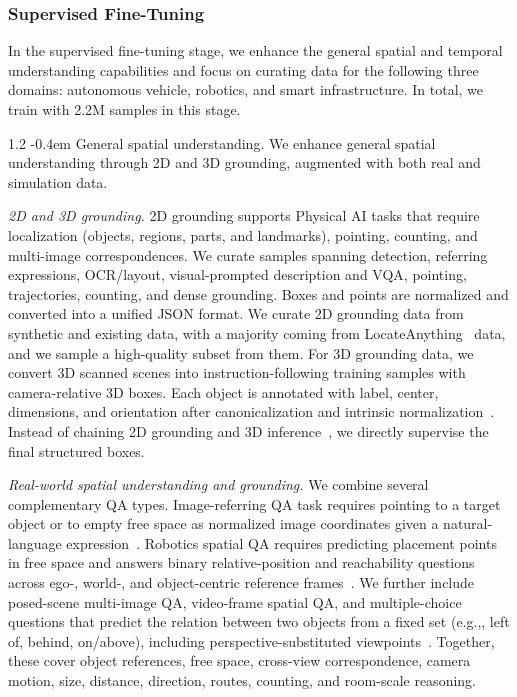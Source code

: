 \documentclass{llmxive}
\makeatletter
\providecommand{\eg}{e.g.,\xspace}
\providecommand{\paragraph}{  \@startsection{paragraph}{4}{\z@}    {1\baselineskip \@plus .2\baselineskip}    {-0.4em}    {\normalfont\normalsize\bfseries}}
\makeatother
\begin{document}
\subsubsection{Supervised Fine-Tuning}
\label{subsubsec::data_reas_posttrain}

In the supervised fine-tuning stage, we enhance the general spatial and temporal understanding capabilities and focus on curating data for the following three domains: autonomous vehicle, robotics, and smart infrastructure. In total, we train with 2.2M samples in this stage.

\paragraph{General spatial understanding.}
We enhance general spatial understanding through 2D and 3D grounding, augmented with both real and simulation data.

\textit{2D and 3D grounding.} 2D grounding supports Physical AI tasks that require localization (objects, regions, parts, and landmarks), pointing, counting, and multi-image correspondences. We curate samples spanning detection, referring expressions, OCR/layout, visual-prompted description and VQA, pointing, trajectories, counting, and dense grounding. Boxes and points are normalized and converted into a unified JSON format. We curate 2D grounding data from synthetic and existing data, with a majority coming from LocateAnything~\citep{wang2025locateanything} data, and we sample a high-quality subset from them. For 3D grounding data, we convert 3D scanned scenes into instruction-following training samples with camera-relative 3D boxes. Each object is annotated with label, center, dimensions, and orientation after canonicalization and intrinsic normalization~\citep{brazil2023omni3d}. Instead of chaining 2D grounding and 3D inference~\citep{gr3d,man2025locateanything3d}, we directly supervise the final structured boxes.

\textit{Real-world spatial understanding and grounding.} We combine several complementary QA types. Image-referring QA task requires pointing to a target object or to empty free space as normalized image coordinates given a natural-language expression~\citep{zhou2025roborefer}. Robotics spatial QA requires predicting placement points in free space and answers binary relative-position and reachability questions across ego-, world-, and object-centric reference frames~\citep{song2025robospatial}. We further include posed-scene multi-image QA, video-frame spatial QA, and multiple-choice questions that predict the relation between two objects from a fixed set (\eg, left of, behind, on/above), including perspective-substituted viewpoints~\citep{liu-etal-2025-multimodal-large}. Together, these cover object references, free space, cross-view correspondence, camera motion, size, distance, direction, routes, counting, and room-scale reasoning.
\end{document}
